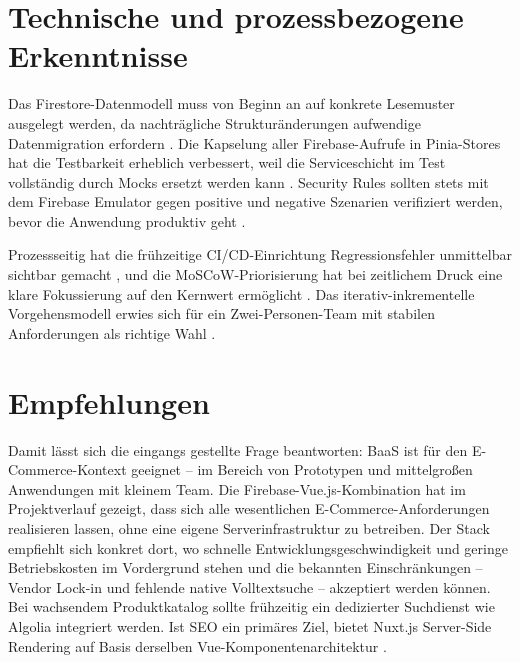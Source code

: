 \section{Technische und prozessbezogene Erkenntnisse}
\label{sec:erkenntnisse}

Das Firestore-Datenmodell muss von Beginn an auf konkrete Lesemuster ausgelegt werden, da nachträgliche Strukturänderungen aufwendige Datenmigration erfordern \cite{kesavan2023}. Die Kapselung aller Firebase-Aufrufe in Pinia-Stores hat die Testbarkeit erheblich verbessert, weil die Serviceschicht im Test vollständig durch Mocks ersetzt werden kann \cite{osherove2024}. Security Rules sollten stets mit dem Firebase Emulator gegen positive und negative Szenarien verifiziert werden, bevor die Anwendung produktiv geht \cite{milojkovic2024}.

Prozessseitig hat die frühzeitige CI/CD-Einrichtung Regressionsfehler unmittelbar sichtbar gemacht \cite{jani2023}, und die MoSCoW-Priorisierung hat bei zeitlichem Druck eine klare Fokussierung auf den Kernwert ermöglicht \cite{kravchenko2022}. Das iterativ-inkrementelle Vorgehensmodell erwies sich für ein Zwei-Personen-Team mit stabilen Anforderungen als richtige Wahl \cite{larman2003}.

\section{Empfehlungen}
\label{sec:empfehlungen}

Damit lässt sich die eingangs gestellte Frage beantworten: BaaS ist für den E-Commerce-Kontext geeignet -- im Bereich von Prototypen und mittelgroßen Anwendungen mit kleinem Team. Die Firebase-Vue.js-Kombination hat im Projektverlauf gezeigt, dass sich alle wesentlichen E-Commerce-Anforderungen realisieren lassen, ohne eine eigene Serverinfrastruktur zu betreiben. Der Stack empfiehlt sich konkret dort, wo schnelle Entwicklungsgeschwindigkeit und geringe Betriebskosten im Vordergrund stehen und die bekannten Einschränkungen -- Vendor Lock-in und fehlende native Volltextsuche -- akzeptiert werden können. Bei wachsendem Produktkatalog sollte frühzeitig ein dedizierter Suchdienst wie Algolia integriert werden. Ist SEO ein primäres Ziel, bietet Nuxt.js Server-Side Rendering auf Basis derselben Vue-Komponentenarchitektur \cite{kowalczyk2024}.
